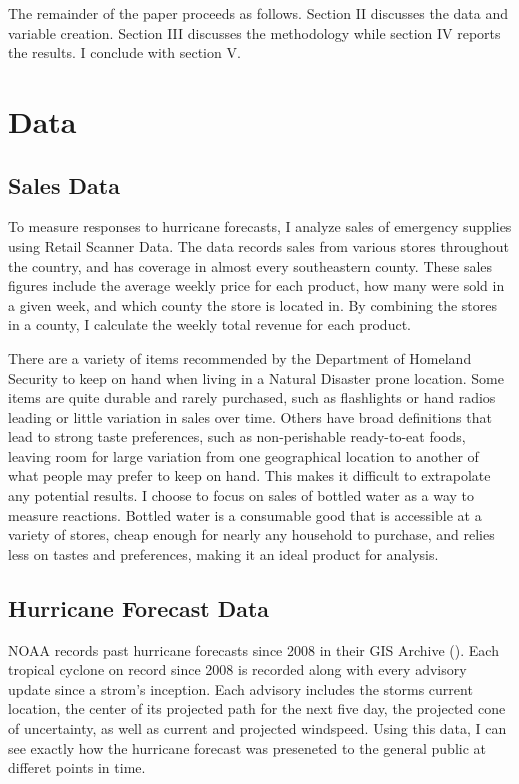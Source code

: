 \documentclass{article}
\begin{document}
The remainder of the paper proceeds as follows. Section II discusses the data and variable creation. Section III discusses the methodology while section IV reports the results. I conclude with section V. 

\section{Data}

\subsection{Sales Data}

To measure responses to hurricane forecasts, I analyze sales of emergency supplies using \citeauthor{Nielsen} Retail Scanner Data. The data records sales from various stores throughout the country, and has coverage in almost every southeastern county. These sales figures include the average weekly price for each product, how many were sold in a given week, and which county the store is located in. By combining the stores in a county, I calculate the weekly total revenue for each product. 

There are a variety of items recommended by the Department of Homeland Security to keep on hand when living in a Natural Disaster prone location. Some items are quite durable and rarely purchased, such as flashlights or hand radios leading or little variation in sales over time. Others have broad definitions that lead to strong taste preferences, such as non-perishable ready-to-eat foods, leaving room for large variation from one geographical location to another of what people may prefer to keep on hand. This makes it difficult to extrapolate any potential results. I choose to focus on sales of bottled water as a way to measure reactions. Bottled water is a consumable good that is accessible at a variety of stores, cheap enough for nearly any household to purchase, and relies less on tastes and preferences, making it an ideal product for analysis.


\subsection{Hurricane Forecast Data}

NOAA records past hurricane forecasts since 2008 in their GIS Archive (\citeauthor{NOAAGIS}). Each tropical cyclone on record since 2008 is recorded along with every advisory update since a strom's inception. Each advisory includes the storms current location, the center of its projected path for the next five day, the projected cone of uncertainty, as well as current and projected windspeed. Using this data, I can see exactly how the hurricane forecast was preseneted to the general public at differet points in time. 
\end{document}
